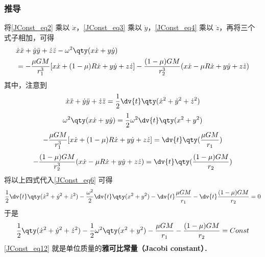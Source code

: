 \subsubsection{推导}
将\autoref{JConst_eq2} 乘以 $\dot{x}$，\autoref{JConst_eq3} 乘以 $\dot{y}$，\autoref{JConst_eq4} 乘以 $\dot{z}$，再将三个式子相加，可得
\begin{equation}\label{JConst_eq6} %
\begin{aligned}
&\dot{x} \ddot{x}+\dot{y}\ddot{y}+\dot{z}\ddot{z}-\omega^2\qty(x\dot{x}+y\dot{y})\\
&=-\frac{\mu GM}{r_1^3}[x\dot{x}+(1-\mu)R\dot{x}+y\dot{y}+z\dot{z}]-\frac{(1-\mu)GM}{r_2^3}(x\dot{x}-\mu R\dot{x}+y\dot{y}+z\dot{z})
\end{aligned}
\end{equation}
其中，注意到
\begin{equation}
\dot{x}\ddot{x}+\dot{y}\ddot{y}+\dot{z}\ddot{z} =\frac{1}{2}\dv{t}\qty(\dot{x}^2+\dot{y}^2+\dot{z}^2)
\end{equation}
\begin{equation}
\omega^2\qty(x\dot{x}+y\dot{y}) =\frac{1}{2}\omega^2\dv{t}\qty(x^2+y^2)
\end{equation}
\begin{equation}
-\frac{\mu GM}{r_1^3}[x\dot{x}+(1-\mu)R\dot{x}+y\dot{y}+z\dot{z}] = \dv{t}\qty(\frac{\mu GM}{r_1})
\end{equation}
\begin{equation}
-\frac{(1-\mu)GM}{r_2^3}(x\dot{x}-\mu R\dot{x}+y\dot{y}+z\dot{z}) = \dv{t}\qty(\frac{(1-\mu) GM}{r_2})
\end{equation}
将以上四式代入\autoref{JConst_eq6} 可得
\begin{equation}%
\frac{1}{2}\dv{t}\qty(\dot{x}^2+\dot{y}^2+\dot{z}^2)-\frac{\omega^2}{2}\dv{t}\qty(x^2+y^2)-\dv{t}\frac{\mu GM}{r_1}-\dv{t}\frac{(1-\mu) GM}{r_2}=0
\end{equation}
于是
\begin{equation}\label{JConst_eq12} %
\frac{1}{2}\qty(\dot{x}^2+\dot{y}^2+\dot{z}^2)-\frac{1}{2}\omega^2\qty(x^2+y^2)-\frac{\mu GM}{r_1}-\frac{(1-\mu) GM}{r_2}=Const
\end{equation}
\autoref{JConst_eq12} 就是单位质量的\textbf{雅可比常量（Jacobi constant）}．

